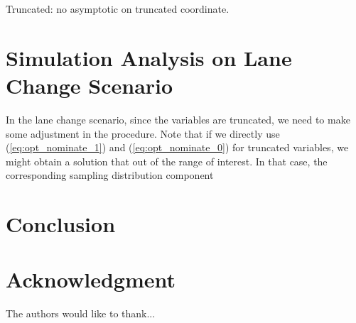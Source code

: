 \documentclass[conference]{IEEEtran}
\begin{document}
Truncated: no asymptotic on truncated coordinate.

\section{Simulation Analysis on Lane Change Scenario}\label{sec:result}
In the lane change scenario, since the variables are truncated, we need to make some adjustment in the procedure. Note that if we directly use (\ref{eq:opt_nominate_1}) and (\ref{eq:opt_nominate_0}) for truncated variables, we might obtain a solution that out of the range of interest. In that case, the corresponding sampling distribution component 

\section{Conclusion}\label{sec:conclusion}
\section*{Acknowledgment}


The authors would like to thank...







%
%
%




\end{document}
